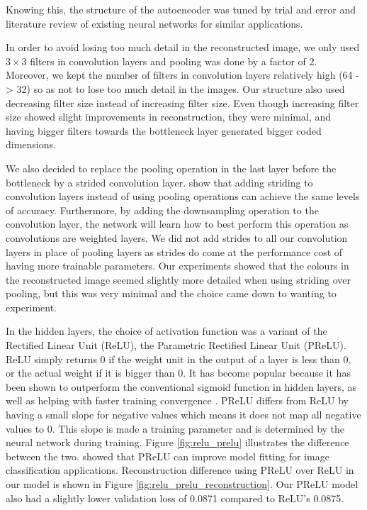 Knowing this, the structure of the autoencoder was tuned by trial and error and literature review of existing neural networks for similar applications.

In order to avoid losing too much detail in the reconstructed image, we only used $3\times3$ filters in convolution layers and pooling was done by a factor of 2. Moreover, we kept the number of filters in convolution layers relatively high (64 -> 32) so as not to lose too much detail in the images. Our structure also used decreasing filter size instead of increasing filter size. Even though increasing filter size showed slight improvements in reconstruction, they were minimal, and having bigger filters towards the bottleneck layer generated bigger coded dimensions.

We also decided to replace the pooling operation in the last layer before the bottleneck by a strided convolution layer. \citet{springenberg_striving_2014} show that adding striding to convolution layers instead of using pooling operations can achieve the same levels of accuracy. Furthermore, by adding the downsampling operation to the convolution layer, the network will learn how to best perform this operation as convolutions are weighted layers. We did not add strides to all our convolution layers in place of pooling layers as strides do come at the performance cost of having more trainable parameters. Our experiments showed that the colours in the reconstructed image seemed slightly more detailed when using striding over pooling, but this was very minimal and the choice came down to wanting to experiment.

In the hidden layers, the choice of activation function was a variant of the Rectified Linear Unit (ReLU), the Parametric Rectified Linear Unit (PReLU). ReLU simply returns 0 if the weight unit in the output of a layer is less than 0, or the actual weight if it is bigger than 0. It has become popular because it has been shown to outperform the conventional sigmoid function \citep{hinton_relu, glorot2011} in hidden layers, as well as helping with faster training convergence \citep{krizhevsky_imagenet_2012}. PReLU differs from ReLU by having a small slope for negative values which means it does not map all negative values to 0. This slope is made a training parameter and is determined by the neural network during training. Figure \ref{fig:relu_prelu} illustrates the difference between the two. \citet{he_2015} showed that PReLU can improve model fitting for image classification applications. Reconstruction difference using PReLU over ReLU in our model is shown in Figure \ref{fig:relu_prelu_reconstruction}. Our PReLU model also had a slightly lower validation loss of 0.0871 compared to ReLU's 0.0875.

